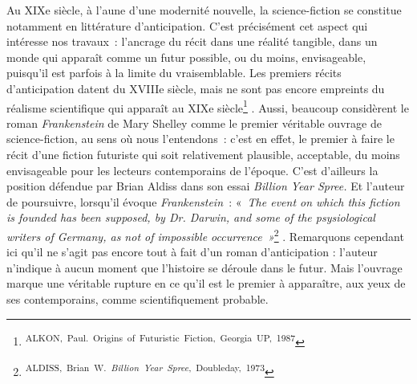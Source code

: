 \documentclass[letterpaper,portrait,12pt]{article}
\begin{document}
	Au XIXe si\`{e}cle, \`{a} l'aune d'une modernit\'{e} nouvelle, la science-fiction se constitue notamment en litt\'{e}rature d'anticipation. C'est pr\'{e}cis\'{e}ment cet aspect qui int\'{e}resse nos travaux : l'ancrage du r\'{e}cit dans une r\'{e}alit\'{e} tangible, dans un monde qui appara\^{i}t comme un futur possible, ou du moins, envisageable, puisqu'il est parfois \`{a} la limite du vraisemblable. Les premiers r\'{e}cits d'anticipation datent du XVIIIe si\`{e}cle, mais ne sont pas encore empreints du r\'{e}alisme scientifique qui appara\^{i}t au XIXe si\`{e}cle\footnote{\textsuperscript{\newpage
}\textsuperscript{	ALKON,\ Paul.\ Origins\ of\ Futuristic\ Fiction,\ Georgia\ UP,\ 1987}} . Aussi, beaucoup consid\`{e}rent le roman \emph{Frankenstein} de Mary Shelley comme le premier v\'{e}ritable ouvrage de science-fiction, au sens où nous l'entendons : c'est en effet, le premier \`{a} faire le r\'{e}cit d'une fiction futuriste qui soit relativement plausible, acceptable, du moins envisageable pour les lecteurs contemporains de l'\'{e}poque. C'est d'ailleurs la position d\'{e}fendue par Brian Aldiss dans son essai \emph{Billion Year Spree.} Et l'auteur de poursuivre, lorsqu'il \'{e}voque\emph{ Frankenstein }:\emph{ }« \emph{The event on which this fiction is founded has been supposed, by Dr. Darwin, and some of the psysiological writers of Germany, as not of impossible occurrence »}\footnote{\textsuperscript{\newpage
}\textsuperscript{	}\textsuperscript{{\tiny ALDISS,\ Brian\ W.\ }}\emph{\textsuperscript{{\tiny Billion\ Year\ Spree}}}\textsuperscript{{\tiny ,\ Doubleday,\ 1973}}} . Remarquons cependant ici qu'il ne s'agit pas encore tout \`{a} fait d'un roman d'anticipation : l'auteur n'indique \`{a} aucun moment que l'histoire se d\'{e}roule dans le futur. Mais l'ouvrage marque une v\'{e}ritable rupture en ce qu'il est le premier \`{a} appara\^{i}tre, aux yeux de ses contemporains, comme scientifiquement probable.
\end{document}
